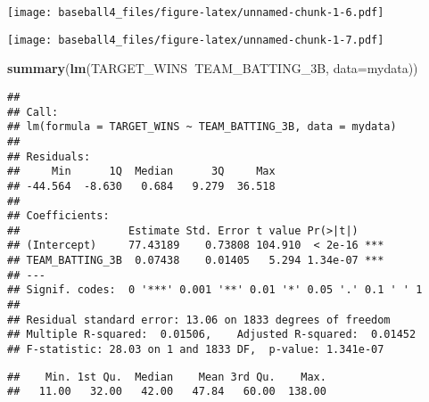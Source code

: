 \documentclass[
]{article}
\newenvironment{Shaded}{\begin{snugshade}}{\end{snugshade}}
\newcommand{\DataTypeTok}[1]{\textcolor[rgb]{0.13,0.29,0.53}{#1}}
\newcommand{\KeywordTok}[1]{\textcolor[rgb]{0.13,0.29,0.53}{\textbf{#1}}}
\newcommand{\NormalTok}[1]{#1}
\newcommand{\OperatorTok}[1]{\textcolor[rgb]{0.81,0.36,0.00}{\textbf{#1}}}
\begin{document}
\texttt{[image: baseball4\_files/figure-latex/unnamed-chunk-1-6.pdf]}

\begin{Shaded}
\end{Shaded}

\texttt{[image: baseball4\_files/figure-latex/unnamed-chunk-1-7.pdf]}

\begin{Shaded}
\begin{Highlighting}[]
\KeywordTok{summary}\NormalTok{(}\KeywordTok{lm}\NormalTok{(TARGET_WINS}\OperatorTok{~}\NormalTok{TEAM_BATTING_3B, }\DataTypeTok{data=}\NormalTok{mydata))}
\end{Highlighting}
\end{Shaded}

\begin{verbatim}
## 
## Call:
## lm(formula = TARGET_WINS ~ TEAM_BATTING_3B, data = mydata)
## 
## Residuals:
##     Min      1Q  Median      3Q     Max 
## -44.564  -8.630   0.684   9.279  36.518 
## 
## Coefficients:
##                 Estimate Std. Error t value Pr(>|t|)    
## (Intercept)     77.43189    0.73808 104.910  < 2e-16 ***
## TEAM_BATTING_3B  0.07438    0.01405   5.294 1.34e-07 ***
## ---
## Signif. codes:  0 '***' 0.001 '**' 0.01 '*' 0.05 '.' 0.1 ' ' 1
## 
## Residual standard error: 13.06 on 1833 degrees of freedom
## Multiple R-squared:  0.01506,    Adjusted R-squared:  0.01452 
## F-statistic: 28.03 on 1 and 1833 DF,  p-value: 1.341e-07
\end{verbatim}

\begin{Shaded}
\end{Shaded}

\begin{verbatim}
##    Min. 1st Qu.  Median    Mean 3rd Qu.    Max. 
##   11.00   32.00   42.00   47.84   60.00  138.00
\end{verbatim}

\begin{Shaded}
\end{Shaded}
\end{document}
